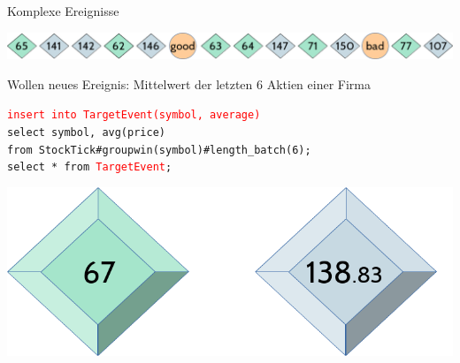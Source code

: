 \documentclass[usenames,dvipsnames]{beamer}
\begin{document}
\begin{frame}{Komplexe Ereignisse}
\begin{center}
    \includegraphics[scale=0.4]{img/stream-2}
\end{center}

\begin{block}{}
    \centering
    Wollen neues Ereignis: Mittelwert der letzten 6 Aktien einer Firma
\end{block}

\begin{exampleblock}{}
    \texttt{\textcolor{red}{insert into TargetEvent(symbol, average)}\\
        select symbol, avg(price)\\
        from StockTick\#groupwin(symbol)\#length\_batch(6);}\\\vspace{0.3cm}
    \texttt{select  * from \textcolor{red}{TargetEvent};}
\end{exampleblock}

\begin{center}
    \includegraphics[scale=0.35]{img/solution-h}
\end{center}

\end{frame}
\end{document}
